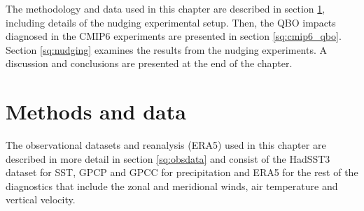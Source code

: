 The methodology and data used in this chapter are described in section \ref{sq:qbo_methoddata}, including details of the nudging experimental setup. Then, the QBO impacts diagnosed in the CMIP6 experiments are presented in section \ref{sq:cmip6_qbo}. Section \ref{sq:nudging} examines the results from the nudging experiments. 
A discussion and conclusions are presented at the end of the chapter. %





\section{Methods and data} \label{sq:qbo_methoddata}

The observational datasets and reanalysis (ERA5) used in this chapter are described in more detail in section \ref{sq:obsdata} and consist of the HadSST3 dataset for SST, GPCP and GPCC for precipitation and ERA5 for the rest of the diagnostics that include the zonal and meridional winds, air temperature and vertical velocity.

